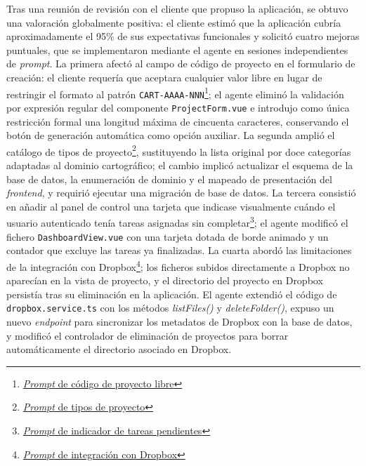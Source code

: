 Tras una reunión de revisión con el cliente que propuso la aplicación, se obtuvo una valoración globalmente positiva: el cliente estimó que la aplicación cubría aproximadamente el 95\% de sus expectativas funcionales y solicitó cuatro mejoras puntuales, que se implementaron mediante el agente en sesiones independientes de \textit{prompt}. La primera afectó al campo de código de proyecto en el formulario de creación: el cliente requería que aceptara cualquier valor libre en lugar de restringir el formato al patrón \texttt{CART-AAAA-NNN}\footnote{\href{https://github.com/alu0101549491/TFG-Fabian-Gonzalez-Lence/blob/main/resources/prompts/4-CartographicProjectManager/6-PeticionesDelCliente/project-code-libre.prompt.md}{\textit{Prompt} de código de proyecto libre}}; el agente eliminó la validación por expresión regular del componente \texttt{ProjectForm.vue} e introdujo como única restricción formal una longitud máxima de cincuenta caracteres, conservando el botón de generación automática como opción auxiliar. La segunda amplió el catálogo de tipos de proyecto\footnote{\href{https://github.com/alu0101549491/TFG-Fabian-Gonzalez-Lence/blob/main/resources/prompts/4-CartographicProjectManager/6-PeticionesDelCliente/project-types.prompt.md}{\textit{Prompt} de tipos de proyecto}}, sustituyendo la lista original por doce categorías adaptadas al dominio cartográfico; el cambio implicó actualizar el esquema de la base de datos, la enumeración de dominio y el mapeado de presentación del \textit{frontend}, y requirió ejecutar una migración de base de datos. La tercera consistió en añadir al panel de control una tarjeta que indicase visualmente cuándo el usuario autenticado tenía tareas asignadas sin completar\footnote{\href{https://github.com/alu0101549491/TFG-Fabian-Gonzalez-Lence/blob/main/resources/prompts/4-CartographicProjectManager/6-PeticionesDelCliente/pending-tasks-icon.prompt.md}{\textit{Prompt} de indicador de tareas pendientes}}; el agente modificó el fichero \texttt{DashboardView.vue} con una tarjeta dotada de borde animado y un contador que excluye las tareas ya finalizadas. La cuarta abordó las limitaciones de la integración con Dropbox\footnote{\href{https://github.com/alu0101549491/TFG-Fabian-Gonzalez-Lence/blob/main/resources/prompts/4-CartographicProjectManager/6-PeticionesDelCliente/dropbox-integration.prompt.md}{\textit{Prompt} de integración con Dropbox}}; los ficheros subidos directamente a Dropbox no aparecían en la vista de proyecto, y el directorio del proyecto en Dropbox persistía tras su eliminación en la aplicación. El agente extendió el código de \texttt{dropbox.service.ts} con los métodos \textit{listFiles()} y \textit{deleteFolder()}, expuso un nuevo \textit{endpoint} para sincronizar los metadatos de Dropbox con la base de datos, y modificó el controlador de eliminación de proyectos para borrar automáticamente el directorio asociado en Dropbox.


